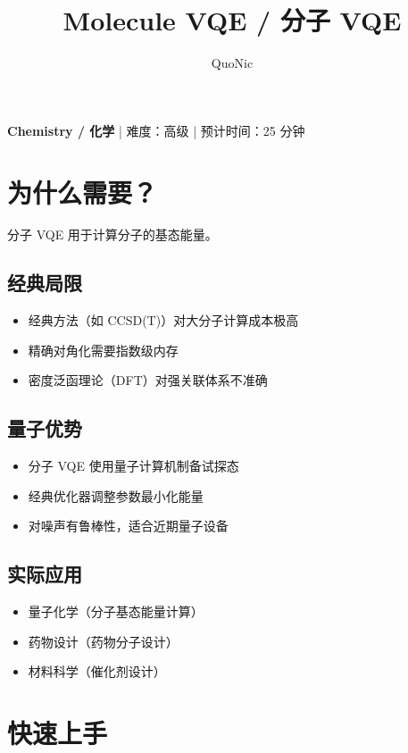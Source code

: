 \documentclass[12pt,a4paper]{article}
\title{Molecule VQE / 分子 VQE}
\author{QuoNic}
\date{}
\begin{document}
\maketitle

\begin{center}
\textbf{Chemistry / 化学} | 难度：高级 | 预计时间：25 分钟
\end{center}

\tableofcontents
\newpage

\section{为什么需要？}

分子 VQE 用于计算分子的基态能量。

\subsection{经典局限}
\begin{itemize}
  \item 经典方法（如 CCSD(T)）对大分子计算成本极高
  \item 精确对角化需要指数级内存
  \item 密度泛函理论（DFT）对强关联体系不准确
\end{itemize}

\subsection{量子优势}
\begin{itemize}
  \item 分子 VQE 使用量子计算机制备试探态
  \item 经典优化器调整参数最小化能量
  \item 对噪声有鲁棒性，适合近期量子设备
\end{itemize}

\subsection{实际应用}
\begin{itemize}
  \item 量子化学（分子基态能量计算）
  \item 药物设计（药物分子设计）
  \item 材料科学（催化剂设计）
\end{itemize}

\section{快速上手}
\end{document}
